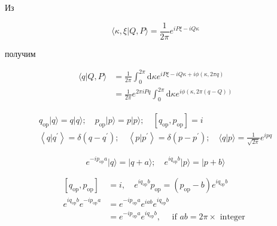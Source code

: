 \documentclass[main.tex]{subfiles}
\begin{document}
Из

\begin{equation}\label{16.57}
	\langle\kappa, \xi | Q, P\rangle=\frac{1}{2 \pi} e^{i P \xi-i Q \kappa}
\end{equation}

получим

\begin{equation}\label{16.58}
	\begin{aligned}
\langle q | Q, P\rangle &=\frac{1}{2 \pi} \int_{0}^{2 \pi} \mathrm{d} \kappa e^{i P \xi-i Q \kappa+i \phi(\kappa, 2 \pi q)} \\
&=\frac{1}{2 \pi} e^{2 \pi i P q} \int_{0}^{2 \pi} \mathrm{d} \kappa e^{i \phi(\kappa, 2 \pi(q-Q))}
\end{aligned}
\end{equation}







\begin{equation}\label{16.3}
	\begin{array}{l}
{q_{\mathrm{op}}|q\rangle= q|q\rangle ; \quad p_{\mathrm{op}}|p\rangle= p|p\rangle ; \quad\left[q_{\mathrm{op}}, p_{\mathrm{op}}\right]=i} \\
{\left\langle q | q^{\prime}\right\rangle=\delta\left(q-q^{\prime}\right) ; \quad\left\langle p | p^{\prime}\right\rangle=\delta\left(p-p^{\prime}\right) ; \quad\langle q | p\rangle=\frac{1}{\sqrt{2 \pi}} e^{i p q}}
\end{array}
\end{equation}

\begin{equation}\label{16.4}
	e^{-i p_{\mathrm{op}} a}|q\rangle=|q+a\rangle ; \quad e^{i q_{\mathrm{op}} b}|p\rangle=|p+b\rangle
\end{equation}

\begin{equation}\label{16.5}
	\begin{aligned}
\left[q_{\mathrm{op}}, p_{\mathrm{op}}\right] &=i, \quad e^{i q_{\mathrm{op}} b} p_{\mathrm{op}}=\left(p_{\mathrm{op}}-b\right) e^{i q_{\mathrm{op}} b} \\
e^{i q_{\mathrm{op}} b} e^{-i p_{\mathrm{op}} a} &=e^{-i p_{\mathrm{op}} a} e^{i a b} e^{i q_{\mathrm{op}} b} \\
&=e^{-i p_{\mathrm{op}} a} e^{i q_{\mathrm{op}} b}, \quad \text { if } a b=2 \pi \times \text { integer }
\end{aligned}
\end{equation}
\end{document}
